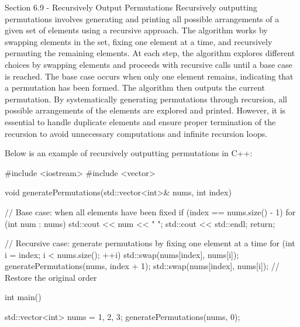 \begin{notes}{Section 6.9 - Recursively Output Permutations}
    Recursively outputting permutations involves generating and printing all possible arrangements of a given set of elements using a recursive approach. The algorithm works by swapping elements in the set, fixing one element at a time, and recursively permuting the remaining elements. At each step, the algorithm explores different choices by swapping 
    elements and proceeds with recursive calls until a base case is reached. The base case occurs when only one element remains, indicating that a permutation has been formed. The algorithm then outputs the current permutation. By systematically generating permutations through recursion, all possible arrangements of the elements are explored and printed. 
    However, it is essential to handle duplicate elements and ensure proper termination of the recursion to avoid unnecessary computations and infinite recursion loops.
    
    \begin{highlight}
        Below is an example of recursively outputting permutations in C++:
    
        \begin{code}[C++]
        #include <iostream>
        #include <vector>
        
        void generatePermutations(std::vector<int>& nums, int index) {
            // Base case: when all elements have been fixed
            if (index == nums.size() - 1) {
                for (int num : nums) {
                    std::cout << num << " ";
                }
                std::cout << std::endl;
                return;
            }
        
            // Recursive case: generate permutations by fixing one element at a time
            for (int i = index; i < nums.size(); ++i) {
                std::swap(nums[index], nums[i]);
                generatePermutations(nums, index + 1);
                std::swap(nums[index], nums[i]);  // Restore the original order
            }
        }
        
        int main() {
            std::vector<int> nums = {1, 2, 3};
            generatePermutations(nums, 0);
        
}
\end{code}
\end{highlight}
\end{notes}
